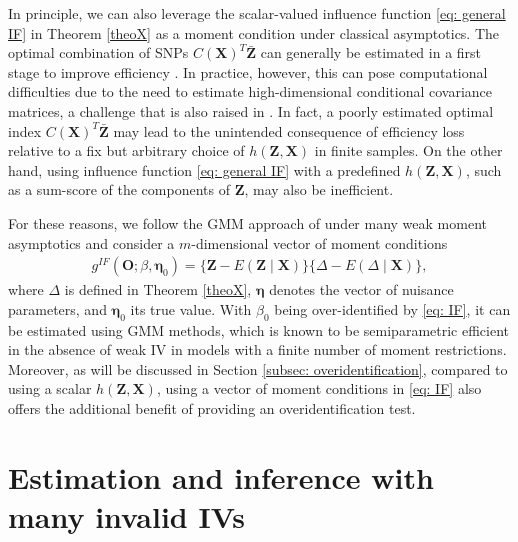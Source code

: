 \documentclass[12pt]{article}
\begin{document}
{In principle, we can also leverage the scalar-valued influence function \eqref{eq: general IF} in Theorem \ref{theoX} as a moment condition under classical asymptotics. The optimal combination of SNPs $C(\boldsymbol{X})^T\bar{\boldsymbol{Z}} $ can generally be estimated in a first stage to improve efficiency \citep{chamberlain1987asymptotic,newey1990efficient}. In practice, however, this can pose computational difficulties due to the need to estimate high-dimensional conditional covariance matrices, a challenge that is also raised in \cite{stephens2014locally}. In fact, a poorly estimated optimal index $C(\boldsymbol{X})^T\bar{\boldsymbol{Z}} $ may lead to the unintended consequence of efficiency loss relative to a fix but arbitrary choice of $h(\bm Z, \bm X)$  in finite samples.   On the other hand, using influence function \eqref{eq: general IF} with a predefined \( h(\bm Z, \bm X) \), such as a sum-score of the components of \( \bm Z \), may also be inefficient. 

For these reasons, we follow the GMM approach of \cite{Newey:2009aa} under many weak moment asymptotics  and consider a $m$-dimensional vector of moment conditions
\begin{align}
  g^{IF}(\bm O; \beta, \bm \eta_0) = \{ \bm Z - E( \bm Z \mid \bm X) \}  \{\Delta- E(\Delta\mid \bm X )\},   \label{eq: IF}
\end{align}
where  $ \Delta$ is defined in Theorem \ref{theoX}, $ \bm \eta  $ denotes the vector of nuisance parameters, and $ \bm \eta_0 $ its true value. With $ \beta_0  $ being over-identified by  \eqref{eq: IF}, it can be estimated using GMM methods, which is known to be semiparametric efficient in the absence of weak IV in models with a finite number of moment restrictions.  Moreover, as will be discussed in Section \ref{subsec: overidentification}, compared to using a scalar \( h(\bm Z, \bm X) \),  using a vector of moment conditions in \eqref{eq: IF} also offers the additional benefit of providing an overidentification test. 
}

\vspace{-5mm}

\section{Estimation and inference  with many invalid IVs}
\label{sec: semi}
\end{document}
